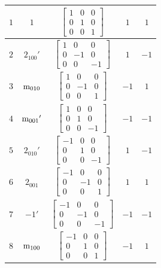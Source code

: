 \documentclass[fleqn,8pt]{jsarticle}
\begin{document}
\begin{longtable}{ccccc}
$ 1 $ & $ 1 $ & $ \begin{bmatrix} 1 & 0 & 0 \\ 0 & 1 & 0 \\ 0 & 0 & 1 \end{bmatrix} $ & $ 1 $ & $ 1 $ \\ \hline
$ 2 $ & $ 2{}_{100}{}' $ & $ \begin{bmatrix} 1 & 0 & 0 \\ 0 & -1 & 0 \\ 0 & 0 & -1 \end{bmatrix} $ & $ 1 $ & $ -1 $ \\ \hline
$ 3 $ & $ {\rm m}_{010} $ & $ \begin{bmatrix} 1 & 0 & 0 \\ 0 & -1 & 0 \\ 0 & 0 & 1 \end{bmatrix} $ & $ -1 $ & $ 1 $ \\ \hline
$ 4 $ & $ {\rm m}_{001}{}' $ & $ \begin{bmatrix} 1 & 0 & 0 \\ 0 & 1 & 0 \\ 0 & 0 & -1 \end{bmatrix} $ & $ -1 $ & $ -1 $ \\ \hline
$ 5 $ & $ 2{}_{010}{}' $ & $ \begin{bmatrix} -1 & 0 & 0 \\ 0 & 1 & 0 \\ 0 & 0 & -1 \end{bmatrix} $ & $ 1 $ & $ -1 $ \\ \hline
$ 6 $ & $ 2{}_{001} $ & $ \begin{bmatrix} -1 & 0 & 0 \\ 0 & -1 & 0 \\ 0 & 0 & 1 \end{bmatrix} $ & $ 1 $ & $ 1 $ \\ \hline
$ 7 $ & $ -1{}' $ & $ \begin{bmatrix} -1 & 0 & 0 \\ 0 & -1 & 0 \\ 0 & 0 & -1 \end{bmatrix} $ & $ -1 $ & $ -1 $ \\ \hline
$ 8 $ & $ {\rm m}_{100} $ & $ \begin{bmatrix} -1 & 0 & 0 \\ 0 & 1 & 0 \\ 0 & 0 & 1 \end{bmatrix} $ & $ -1 $ & $ 1 $ \\
\end{longtable}
\end{document}
